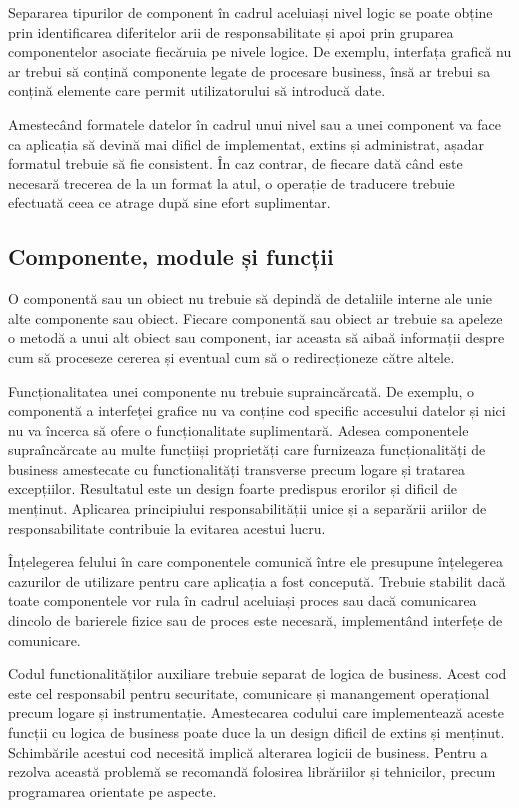\documentclass[12pt, a4paper, oneside, romanian]{teza-upb}
\begin{document}
Separarea tipurilor de component în cadrul aceluiași nivel logic se poate obține prin identificarea diferitelor arii de responsabilitate și apoi prin gruparea componentelor asociate fiecăruia pe nivele logice. De exemplu, interfața grafică nu ar trebui să conțină componente legate de procesare business, însă ar trebui sa conțină elemente care permit utilizatorului să introducă date.

Amestecând formatele datelor în cadrul unui nivel sau a unei component va face ca aplicația să devină mai dificl de implementat, extins și administrat, așadar formatul trebuie să fie consistent. În caz contrar, de fiecare dată când este necesară trecerea de la un format la atul, o operație de traducere trebuie efectuată ceea ce atrage după sine efort suplimentar.

\subsection{Componente, module și funcții}
O componentă sau un obiect nu trebuie să depindă de detaliile interne ale unie alte componente sau obiect. Fiecare componentă sau obiect ar trebuie sa apeleze o metodă a unui alt obiect sau component, iar aceasta să aibaă informații despre cum să proceseze cererea și eventual cum să o redirecționeze către altele.

Funcționalitatea unei componente nu trebuie supraincărcată. De exemplu, o componentă a interfeței grafice nu va conține cod specific accesului datelor și nici nu va încerca să ofere o funcționalitate suplimentară. Adesea componentele supraîncărcate au multe funcțiiși proprietăți care furnizeaza funcționalități de business amestecate cu functionalități transverse precum logare și tratarea excepțiilor. Resultatul este un design foarte predispus erorilor și dificil de menținut. Aplicarea principiului responsabilității unice și a separării ariilor de responsabilitate contribuie la evitarea acestui lucru.

Înțelegerea felului în care componentele comunică între ele presupune înțelegerea cazurilor de utilizare pentru care aplicația a fost concepută. Trebuie stabilit dacă toate componentele vor rula în cadrul aceluiași proces sau dacă comunicarea dincolo de barierele fizice sau de proces este necesară, implementând interfețe de comunicare.

Codul functionalităților auxiliare trebuie separat de logica de business. Acest cod este cel responsabil pentru securitate, comunicare și manangement operațional precum logare și instrumentație. Amestecarea codului care implementează aceste funcții cu logica de business poate duce la un design dificil de extins și menținut. Schimbările acestui cod necesită implică alterarea logicii de business. Pentru a rezolva această problemă se recomandă folosirea librăriilor și tehnicilor, precum programarea orientate pe aspecte.
\end{document}
